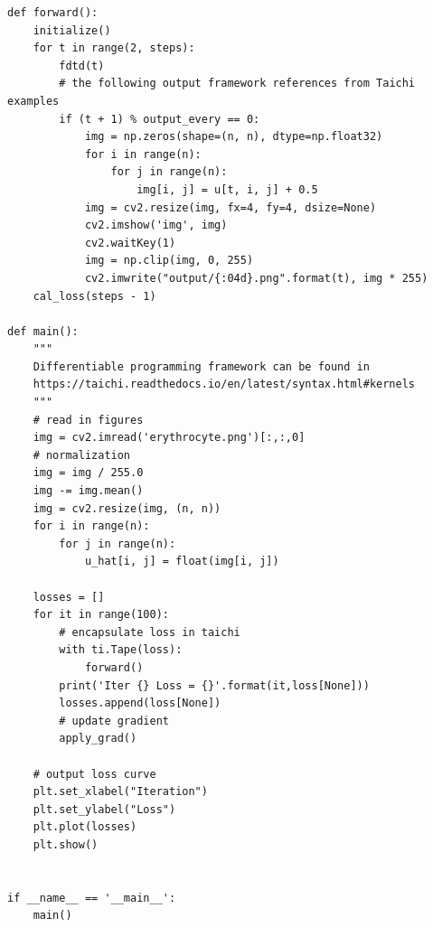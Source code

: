 \documentclass[thesis]{thesis}
\begin{document}
\begin{lstlisting}
def forward():
    initialize()
    for t in range(2, steps):
        fdtd(t)
        # the following output framework references from Taichi examples
        if (t + 1) % output_every == 0:
            img = np.zeros(shape=(n, n), dtype=np.float32)
            for i in range(n):
                for j in range(n):
                    img[i, j] = u[t, i, j] + 0.5
            img = cv2.resize(img, fx=4, fy=4, dsize=None)
            cv2.imshow('img', img)
            cv2.waitKey(1)
            img = np.clip(img, 0, 255)
            cv2.imwrite("output/{:04d}.png".format(t), img * 255)
    cal_loss(steps - 1)

def main():
    """
    Differentiable programming framework can be found in
    https://taichi.readthedocs.io/en/latest/syntax.html#kernels
    """
    # read in figures
    img = cv2.imread('erythrocyte.png')[:,:,0]
    # normalization
    img = img / 255.0
    img -= img.mean()
    img = cv2.resize(img, (n, n))
    for i in range(n):
        for j in range(n):
            u_hat[i, j] = float(img[i, j])

    losses = []
    for it in range(100):
        # encapsulate loss in taichi
        with ti.Tape(loss):
            forward()
        print('Iter {} Loss = {}'.format(it,loss[None]))
        losses.append(loss[None])
        # update gradient
        apply_grad()

    # output loss curve
    plt.set_xlabel("Iteration")
    plt.set_ylabel("Loss")
    plt.plot(losses)
    plt.show()


if __name__ == '__main__':
    main()
\end{lstlisting}
\end{document}
